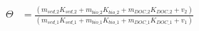 \documentclass[fleqn, oneside, 11pt]{article}%
\begin{document}
\begin{preview}
\begin{align*}%
\Theta & = \frac{(m_{sed\_2}K_{sed\_2} + m_{bio\_2}K_{bio\_2} + m_{DOC\_2}K_{DOC\_2} + v_{2})}{(m_{sed\_1}K_{sed\_1} + m_{bio\_1}K_{bio\_1} + m_{DOC\_1}K_{DOC\_1} + v_{1})} \nonumber \\
\end{align*} 
\end{preview}
\end{document}
